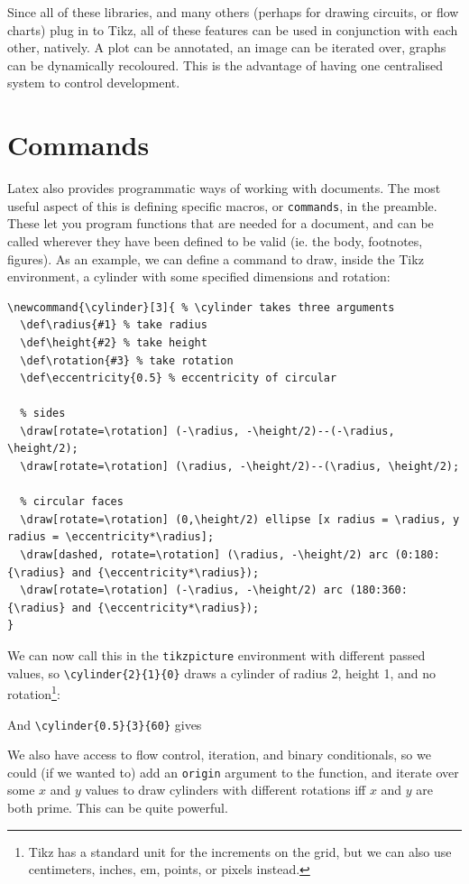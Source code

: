 \documentclass[12pt]{article}
\newcommand{\cylinder}[3]{ %
  \def\radius{#1} %
  \def\height{#2} %
  \def\rotation{#3} %
  \def\eccentricity{0.5} %

  \draw[rotate=\rotation] (-\radius, -\height/2)--(-\radius, \height/2);
  \draw[rotate=\rotation] (\radius, -\height/2)--(\radius, \height/2);

  \draw[rotate=\rotation] (0,\height/2) ellipse [x radius = \radius, y radius = \eccentricity*\radius];
  \draw[dashed, rotate=\rotation] (\radius, -\height/2) arc (0:180:{\radius} and {\eccentricity*\radius});
  \draw[rotate=\rotation] (-\radius, -\height/2) arc (180:360:{\radius} and {\eccentricity*\radius});
}
\begin{document}
Since all of these libraries, and many others (perhaps for drawing circuits, or flow charts) plug in to Tikz, all of these features can be used in conjunction with each other, natively. A plot can be annotated, an image can be iterated over, graphs can be dynamically recoloured. This is the advantage of having one centralised system to control development.

\section{Commands}

Latex also provides programmatic ways of working with documents. The most useful aspect of this is defining specific macros, or \texttt{commands}, in the preamble. These let you program functions that are needed for a document, and can be called wherever they have been defined to be valid (ie. the body, footnotes, figures). As an example, we can define a command to draw, inside the Tikz environment, a cylinder with some specified dimensions and rotation:

\begin{verbatim}
\newcommand{\cylinder}[3]{ % \cylinder takes three arguments
  \def\radius{#1} % take radius
  \def\height{#2} % take height
  \def\rotation{#3} % take rotation
  \def\eccentricity{0.5} % eccentricity of circular 

  % sides 
  \draw[rotate=\rotation] (-\radius, -\height/2)--(-\radius, \height/2);
  \draw[rotate=\rotation] (\radius, -\height/2)--(\radius, \height/2);

  % circular faces 
  \draw[rotate=\rotation] (0,\height/2) ellipse [x radius = \radius, y radius = \eccentricity*\radius];
  \draw[dashed, rotate=\rotation] (\radius, -\height/2) arc (0:180:{\radius} and {\eccentricity*\radius});
  \draw[rotate=\rotation] (-\radius, -\height/2) arc (180:360:{\radius} and {\eccentricity*\radius});
}
\end{verbatim}
We can now call this in the \texttt{tikzpicture} environment with different passed values, so \verb|\cylinder{2}{1}{0}| draws a cylinder of radius 2, height 1, and no rotation\footnote{Tikz has a standard unit for the increments on the grid, but we can also use centimeters, inches, em, points, or pixels instead.}:
\begin{center}
\end{center}
And \verb|\cylinder{0.5}{3}{60}| gives
\begin{center}
\end{center}
We also have access to flow control, iteration, and binary conditionals, so we could (if we wanted to) add an \texttt{origin} argument to the function, and iterate over some $x$ and $y$ values to draw cylinders with different rotations iff $x$ and $y$ are both prime. This can be quite powerful.
\end{document}
